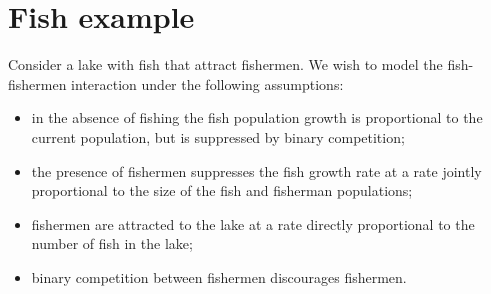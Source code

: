 \section{Fish example}
\begin{example}[frametitle=Fishing]
Consider a lake with fish that attract fishermen. We wish to model the fish-fishermen interaction under the following assumptions:
\begin{itemize}
\item in the absence of fishing the fish population growth is proportional to the current population, but is suppressed by binary competition;
\item the presence of fishermen suppresses the fish growth rate at a rate jointly proportional to the size of the fish and fisherman populations;
\item fishermen are attracted to the lake at a rate directly proportional to the number of fish in the lake;
\item binary competition between fishermen discourages fishermen.
\end{itemize}


\end{example}
